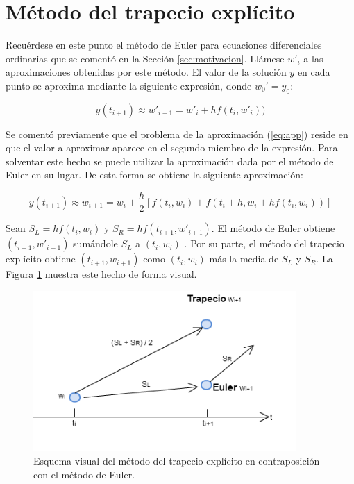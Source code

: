 \documentclass{article}
\theoremstyle{theorem-style}  %
\theoremstyle{definition-style}
\theoremstyle{example-style}
\begin{document}

\section{Método del trapecio explícito}	 \label{sec:trapecio-explicito}

		Recuérdese en este punto el método de Euler para ecuaciones diferenciales ordinarias que se comentó en la Sección \ref{sec:motivacion}. Llámese $w'_i$ a las aproximaciones obtenidas por este método. El valor de la solución $y$ en cada punto se aproxima mediante la siguiente expresión, donde $w_0' = y_0$:

		\begin{equation*} \label{eq:euler}
			y(t_{i+1}) \approx w'_{i+1} = w'_i + h f(t_i,w'_i))
		\end{equation*}

		Se comentó previamente que el problema de la aproximación (\ref{eq:app}) reside en que el valor a aproximar aparece en el segundo miembro de la expresión. Para solventar este hecho se puede utilizar la aproximación dada por el método de Euler en su lugar. De esta forma se obtiene la siguiente aproximación:

		\begin{equation} \label{eq:app-exp}
			y(t_{i+1}) \approx w_{i+1} = w_i + \frac{h}{2} \left[f(t_i,w_i) + f(t_{i}+h, w_i + h f(t_i,w_i))\right]
		\end{equation}

		Sean $S_L = h f(t_i,w_i) $ y $S_R = h f(t_{i+1}, w'_{i+1})$. El método de Euler  obtiene $(t_{i+1}, w'_{i+1})$ sumándole $S_L$ a $(t_{i}, w_{i})$ . Por su parte, el método del trapecio explícito obtiene $(t_{i+1}, w_{i+1})$ como $(t_{i}, w_{i})$ más la media de $S_L$ y $S_R$. La Figura \ref{fig:trapecio-vs-euler} muestra este hecho de forma visual.

		\begin{figure}[H]
			\centering
			\includegraphics[width=10cm]{./Images/trapecio-vs-euler.png}
			\caption{Esquema visual del método del trapecio explícito en contraposición con el método de Euler.}
			\label{fig:trapecio-vs-euler}
		\end{figure}
\end{document}
